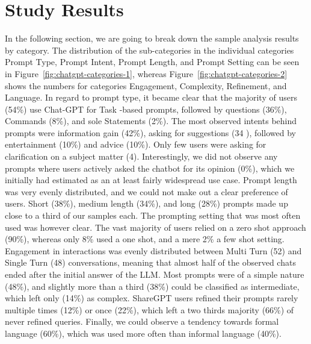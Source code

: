 \section{Study Results}
\label{sec:study-results}
In the following section, we are going to break down the sample analysis results by category.
The distribution of the sub-categories in the individual categories Prompt Type, Prompt
Intent, Prompt Length, and Prompt Setting can be seen in Figure~\ref{fig:chatgpt-categories-1},
whereas Figure~\ref{fig:chatgpt-categories-2} shows the numbers for categories Engagement,
Complexity, Refinement, and Language.
In regard to prompt type, it became clear that the majority of users (54\%) use Chat-GPT for Task
-based prompts, followed by questions (36\%), Commands (8\%), and sole Statements (2\%).
The most observed intents behind prompts were information gain (42\%), asking for suggestions (34
), followed by entertainment (10\%) and advice (10\%).
Only few users were asking for clarification on a subject matter (4).
Interestingly, we did not observe any prompts where users actively asked the chatbot for its
opinion (0\%), which we initially had estimated as an at least fairly widespread use case.
Prompt length was very evenly distributed, and we could not make out a clear preference of users.
Short (38\%), medium length (34\%), and long (28\%) prompts made up close to a third of our samples each.
The prompting setting that was most often used was however clear.
The vast majority of users relied on a zero shot approach (90\%), whereas only 8\% used a one shot,
and a mere 2\% a few shot setting.
Engagement in interactions was evenly distributed between Multi Turn (52) and Single Turn (48)
conversations, meaning that almost half of the observed chats ended after the initial answer of
the LLM\@.
Most prompts were of a simple nature (48\%), and slightly more than a third (38\%) could be
classified as intermediate, which left only (14\%) as complex.
ShareGPT users refined their prompts rarely multiple times (12\%) or once (22\%), which left a
two thirds majority (66\%) of never refined queries.
Finally, we could observe a tendency towards formal language (60\%), which was used more often
than informal language (40\%).

